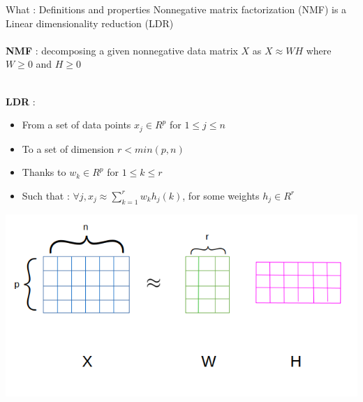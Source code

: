 \begin{frame}{What : Definitions and properties}
     Nonnegative matrix factorization (NMF) is a Linear dimensionality reduction (LDR) \\
         ~\\
         

     \textbf{NMF} : decomposing a given nonnegative data matrix $X$ as $X \approx W H$ where $W \geq 0$ and $H \geq 0$ %
     
          ~\\
          
     \textbf{LDR} : \\
     \begin{itemize}
         \item From a set of data points $x_j \in R^{p}$ for $1 \leq j \leq n$ 
         \item To a set of dimension $r < min(p,n)$
         \item Thanks to $w_k \in R^p$ for $1 \leq k \leq r$
         \item Such that : $\forall j, x_j \approx \sum_{k = 1}^{r} w_{k} h_{j}(k)$, for some weights $h_j\in R^r$
     \end{itemize}     
     \centering
\includegraphics[scale=0.28]{../images/matrices.png}


\end{frame}
